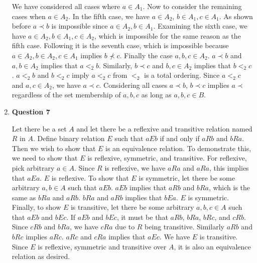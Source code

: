 \documentclass{article}
\begin{document}
\begin{enumerate}
\medskip
We have considered all cases where $a \in A_1$. Now to consider the remaining cases when $a \in A_2$. In the fifth case, we have $a \in A_2$, $b \in A_1, c \in A_1$. As shown before $a \prec b$ is impossible since $a \in A_2, b \in A_1$. Examining the sixth case, we have $a \in A_2, b \in A_1, c \in A_2$, which is impossible for the same reason as the fifth case. Following it is the seventh case, which is impossible because $a \in A_2, b \in A_2, c \in A_1$ implies $b \not \prec c$. Finally the case $a,b,c \in A_2$. $a \prec b$ and $a,b \in A_2$ implies that $a <_{2} b$. Similarly, $b \prec c$ and $b,c \in A_2$ implies that $b <_{2} c$. $a <_{2} b$ and $b <_{2} c$ imply $a <_{2} c$ from $<_{2}$ is a total ordering. Since $a <_{2} c$ and $a,c \in A_2$, we have $a \prec c$. Considering all cases $a \prec b$, $b \prec c$ implies $a \prec $ regardless of the set membership of $a,b,c$ as long as $a,b,c \in B$.

\item \textbf{Question 7}

Let there be a set $A$ and let there be a reflexive and transitive relation named $R$ in $A$. Define binary relation $E$ such that $aEb$ if and only if $aRb$ and $bRa$. Then we wish to show that $E$ is an equivalence relation. To demonstrate this, we need to show that $E$ is reflexive, symmetric, and transitive. For reflexive, pick arbitrary $a \in A$. Since $R$ is reflexive, we have $aRa$ and $aRa$, this implies that $aEa$. $E$ is reflexive. To show that $E$ is symmetric, let there be some arbitrary $a,b \in A$ such that $aEb$. $aEb$ implies that $aRb$ and $bRa$, which is the same as $bRa$ and $aRb$. $bRa$ and $aRb$ implies that $bEa$. $E$ is symmetric. Finally, to show $E$ is transitive, let there be some arbitrary $a,b,c \in A$ such that $aEb$ and $bEc$. If $aEb$ and $bEc$, it must be that $aRb$, $bRa$, $bRc$, and $cRb$. Since $cRb$ and $bRa$, we have $cRa$ due to $R$ being transitive. Similarly $aRb$ and $bRc$ implies $aRc$. $aRc$ and $cRa$ implies that $aEc$. We have $E$ is transitive. Since $E$ is reflexive, symmetric and transitive over $A$, it is also an equivalence relation as desired.

\medskip


\end{enumerate}
\end{document}
